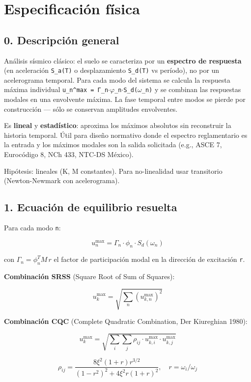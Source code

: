 \documentclass[11pt,letterpaper,oneside]{report}
\begin{document}
\section{Especificación física}

\subsection{0. Descripción general}

Análisis sísmico clásico: el suelo se caracteriza por un \textbf{espectro de respuesta} (en aceleración \texttt{S\_a(T)} o desplazamiento \texttt{S\_d(T)} vs período), no por un acelerograma temporal. Para cada modo del sistema se calcula la respuesta máxima individual \texttt{u\_n\textasciicircum{}max = Γ\_n\ensuremath{\cdot}\ensuremath{\varphi}\_n\ensuremath{\cdot}S\_d(\ensuremath{\omega}\_n)} y se combinan las respuestas modales en una envolvente máxima. La fase temporal entre modos se pierde por construcción --- sólo se conservan amplitudes envolventes.

Es \textbf{lineal} y \textbf{estadístico}: aproxima los máximos absolutos sin reconstruir la historia temporal. Útil para diseño normativo donde el espectro reglamentario es la entrada y los máximos modales son la salida solicitada (e.g., ASCE 7, Eurocódigo 8, NCh 433, NTC-DS México).

Hipótesis: lineales (K, M constantes). Para no-linealidad usar transitorio (Newton-Newmark con acelerograma).

\subsection{1. Ecuación de equilibrio resuelta}

Para cada modo \texttt{n}:

\[
u_n^{\max} = \Gamma_n \cdot \phi_n \cdot S_d(\omega_n)
\]

con $\Gamma_n = \phi_n^T M\, r$ el factor de participación modal en la dirección de excitación \texttt{r}.

\textbf{Combinación SRSS} (Square Root of Sum of Squares):

\[
u^{\max}_k = \sqrt{\sum_n (u_{k,n}^{\max})^2}
\]

\textbf{Combinación CQC} (Complete Quadratic Combination, Der Kiureghian 1980):

\[
u^{\max}_k = \sqrt{\sum_i \sum_j \rho_{ij} \cdot u_{k,i}^{\max} \cdot u_{k,j}^{\max}}
\]

\[
\rho_{ij} = \frac{8\xi^2(1+r) r^{3/2}}{(1-r^2)^2 + 4\xi^2 r (1+r)^2}, \quad r = \omega_i/\omega_j
\]
\end{document}

